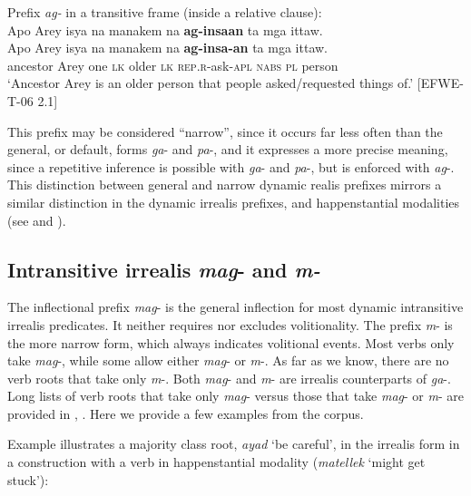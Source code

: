 \ea
\label{ex:ag}
Prefix \textit{ag-} in a transitive frame (inside a relative clause): \\
Apo  Arey  isya  na  manakem  na  \textbf{ag-insaan}  ta  mga  ittaw. \\\smallskip
 \gll Apo  Arey  isya  na  manakem  na  \textbf{ag-insa-an}  ta  mga  ittaw. \\
ancestor  Arey  one  \textsc{lk}  older  \textsc{lk}  \textsc{rep.r}-ask-\textsc{apl}  \textsc{nabs}  \textsc{pl}  person \\
\glt ‘Ancestor Arey is an older person that people asked/requested things of.’ [EFWE-T-06 2.1]
\z

This prefix may be considered “narrow”, since it occurs far less often than the general, or default, forms \textit{ga}{}- and \textit{pa}{}-, and it expresses a more precise meaning, since a repetitive inference is possible with \textit{ga}{}- and \textit{pa}{}-, but is enforced with \textit{ag}{}-. This distinction between general and narrow dynamic realis prefixes mirrors a similar distinction in the dynamic irrealis prefixes, and happenstantial modalities (see  and ).

\subsection{Intransitive irrealis \textit{mag}{}- and \textit{m-}}
\label{sec:intransitiveirrealis}

The inflectional prefix \textit{mag}{}- is the general  inflection for most dynamic intransitive irrealis predicates. It neither requires nor excludes volitionality. The prefix \textit{m}{}- is the more narrow form, which always indicates volitional events. Most verbs only take \textit{mag}{}-, while some allow either \textit{mag}{}- or \textit{m}{}-. As far as we know, there are no verb roots that take only \textit{m}{}-. Both \textit{mag}{}- and \textit{m}{}- are irrealis counterparts of \textit{ga}{}-. Long lists of verb roots that take only \textit{mag}- versus those that take \textit{mag}- or \textit{m}- are provided in , . Here we provide a few examples from the corpus.

Example  illustrates a majority class root, \textit{ayad} ‘be careful’, in the irrealis form in a construction with a verb in happenstantial modality (\textit{matellek} ‘might get stuck’):

